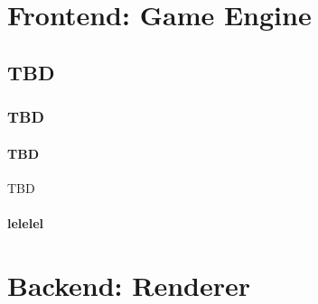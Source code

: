 \section{Frontend: Game Engine}

\subsection{TBD}

\subsubsection{TBD}
 
\paragraph{TBD} TBD
\paragraph{lelelel}

\section{Backend: Renderer}